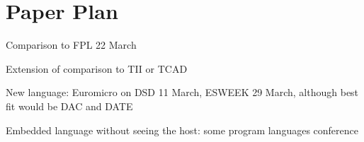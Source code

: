 \documentclass[a4paper, conference]{IEEEtran}
\begin{document}



\section{Paper Plan}

Comparison to FPL 22 March

Extension of comparison to TII or TCAD

New language: Euromicro on DSD 11 March, ESWEEK 29 March, although best fit would be DAC and DATE

Embedded language without seeing the host: some program languages conference
\end{document}
